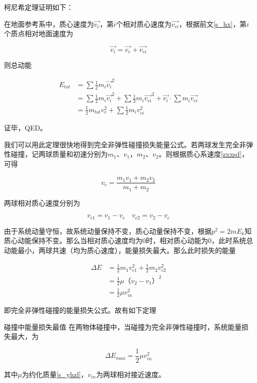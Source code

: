 柯尼希定理证明如下：

在地面参考系中，质心速度为$\vec{v_c}$，第$i$个相对质心速度为$\vec{v_{ci}}$，根据前文\eqref{s_hx}，第$i$个质点相对地面速度为

$$\vec{v_i} = \vec{v_c} + \vec{v_{ci}}$$

则总动能

\begin{subequations}
\begin{align*}
E_{tot} &= \sum \frac{1}{2} m_i \vec{v_i}^2 \\
&= \sum \frac{1}{2} m_i \vec{v_i}^2 + \sum \frac{1}{2} m_i \vec{v_{ci}}^2 + \vec{v_i} \cdot \sum m_i \vec{v_{ci}} \\
&= \frac{1}{2} m_{tot} v_c^2 + \sum \frac{1}{2} m_i v_{ci}^2
\end{align*}
\end{subequations}

证毕，QED。 

我们可以用此定理很快地得到完全非弹性碰撞损失能量公式。若两球发生完全非弹性碰撞，记两球质量和初速分别为$m_1$、$v_1$，$m_2$、$v_2$。则根据质心系速度\eqref{zxxsd}，可得

$$v_c = \frac{m_1 v_1 + m_2 v_2}{m_1+m_2}$$

两球相对质心速度分别为

$$v_{c1} = v_1 - v_c \quad v_{c2} = v_2 - v_c$$

由于系统动量守恒，故系统动量保持不变，质心动量保持不变，根据$p^2 = 2 m E_k$知质心动能保持不变。那么当相对质心速度均为$0$时，相对质心动能为$0$，此时系统总动能最小，两球共速（均为质心速度），能量损失最大。那么此时损失的能量

\begin{subequations}
\begin{align*}
\Delta E &= \frac{1}{2} m_1 v_{c1}^2 + \frac{1}{2} m_2 v_{c2}^2 \\
&= \frac{1}{2} \mu （v_2 - v_1）^2 \\
&= \frac{1}{2} \mu v_{in}^2
\end{align*}
\end{subequations}

即完全非弹性碰撞的能量损失公式。故有如下定理

\begin{theo}{碰撞中能量损失最值}{}
在两物体碰撞中，当碰撞为完全非弹性碰撞时，系统能量损失最大，为

$$\Delta E_{max} = \frac{1}{2} \mu v_{in}^2$$

其中$\mu$为约化质量\eqref{s_yhzl}，$v_{in}$为两球相对接近速度。
\end{theo}

